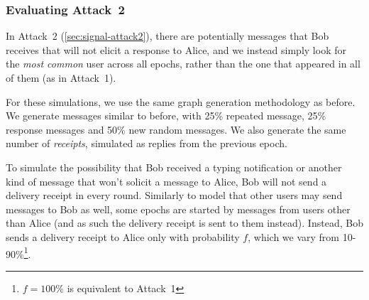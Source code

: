 
\subsubsection{Evaluating Attack~2}
\label{sssec:signal-attack}

\RankGraph

In Attack~2 (\cref{sec:signal-attack2}), there are potentially messages that Bob
receives that will not elicit a response to Alice, and we instead simply look
for the \emph{most common} user across all epochs, rather than the one that
appeared in all of them (as in Attack~1).


\LikelihoodGraph

For these simulations, we use the same graph generation methodology as before.
We generate messages similar to before,
with 25\% repeated message, 25\% response messages
and 50\% new random messages.  We also generate the same number of {\em
receipts}, simulated as replies from the previous epoch.

To simulate the possibility that Bob received a typing notification or another
kind of message that won't solicit a message to Alice, Bob
will not send a delivery receipt in every round. Similarly to model that other
users may send messages to Bob as well, some epochs are started by messages from
users other than Alice (and as such the delivery receipt is sent to them
instead). Instead, Bob sends a delivery receipt to Alice only with probability
$f$, which we vary from 10-90\%\footnote{$f = 100\%$ is equivalent to
Attack~1}.


